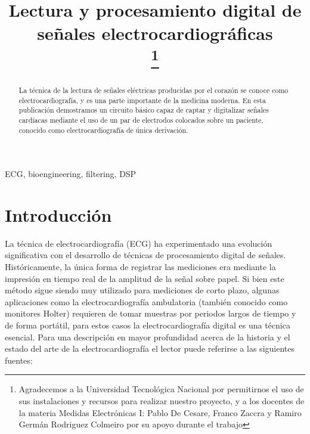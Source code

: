 \documentclass[conference]{IEEEtran}
\begin{document}
 
 
\title{Lectura y procesamiento digital de señales electrocardiográficas\\
\thanks{Agradecemos a la Universidad Tecnológica Nacional por permitirnos
el uso de sus instalaciones y recursos para realizar nuestro proyecto, y a los
docentes de la materia Medidas Electrónicas I: Pablo De Cesare, Franco Zaccra
y Ramiro Germán Rodriguez Colmeiro por su apoyo durante el trabajo}
}

\author{
\and 
{}
}

\maketitle

\begin{abstract}
La técnica de la lectura de señales eléctricas producidas por el corazón se
conoce como electrocardiografía, y es una parte importante de la medicina
moderna. En esta publicación demostramos un circuito básico capaz de captar y
digitalizar señales cardíacas mediante el uso de un par de electrodos colocados
sobre un paciente, conocido como electrocardiografía de única derivación. 
\end{abstract}

\begin{IEEEkeywords}
ECG, bioengineering, filtering, DSP
\end{IEEEkeywords}

\section{Introducción}
 
La técnica de electrocardiografía (ECG) ha experimentado una evolución
significativa con el desarrollo de técnicas de procesamiento digital de señales.
Históricamente, la única forma de registrar las mediciones era mediante la
impresión en tiempo real de la amplitud de la señal sobre papel. Si bien este
método sigue siendo muy utilizado para mediciones de corto plazo, algunas
aplicaciones como la electrocardiografía ambulatoria (también conocido como
monitores Holter) requieren de tomar muestras por periodos largos de tiempo y de
forma portátil, para estos casos la electrocardiografía digital es una técnica
esencial. Para una descripción en mayor profundidad acerca de la historia y el
estado del arte de la electrocardiografía el lector puede referirse a las
siguientes fuentes: \cite{ecg_history} \cite{ecg_moderno}
  
\end{document}
